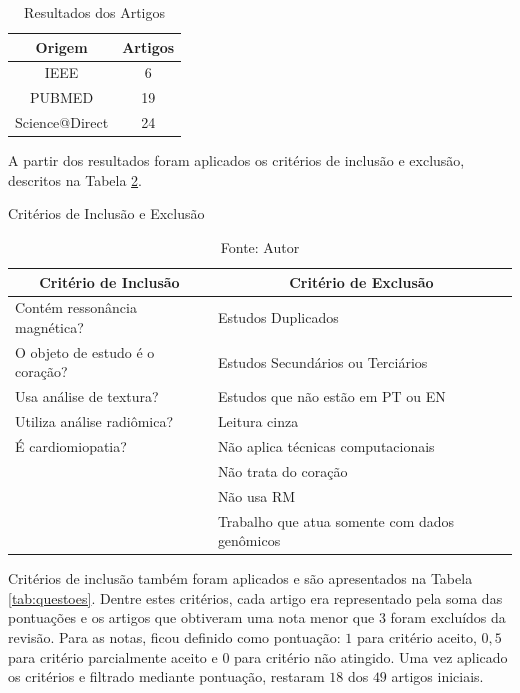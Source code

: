 \begin{table}[hbtp]
    \centering
    \renewcommand{\arraystretch}{1.4} %
    \begin{tabular}{|c|c|}
    \hline 
          \textbf{Origem} & \textbf{Artigos}  \\ 
    \hline 
        IEEE & 6 \\ 
        PUBMED & 19 \\ 
        Science@Direct & 24 \\ 
    \hline 
    \end{tabular} 
    \caption{Resultados dos Artigos}
    \label{tab:resultado_busca}
\end{table}

A partir dos resultados foram aplicados os critérios de inclusão e exclusão, descritos na Tabela \ref{tab:criterios}.

\begin{table}[hbtp]
    \centering
    \caption{Critérios de Inclusão e Exclusão}
    \renewcommand{\arraystretch}{1.4} %
    \begin{tabular}{|l|l|}
    \hline 
          \multicolumn{1}{|c|}{\textbf{Critério de Inclusão}} & \multicolumn{1}{c|}{\textbf{Critério de Exclusão}}  \\ 
    \hline 
        \quad Contém ressonância magnética? & \quad Estudos Duplicados   \\ 
        \quad O objeto de estudo é o coração? & \quad Estudos Secundários ou Terciários \\
        \quad Usa análise de textura? & \quad Estudos que não estão em PT ou EN\\
        \quad Utiliza análise radiômica? & \quad Leitura cinza  \\
        \quad É cardiomiopatia? & \quad Não aplica técnicas computacionais\\
        & \quad Não trata do coração \\
        & \quad Não usa RM \\
        & \quad Trabalho que atua somente com dados genômicos \\ 
    \hline 
    \end{tabular} 
    \caption*{Fonte: Autor}
    \label{tab:criterios}
\end{table}

Critérios de inclusão também foram aplicados e são apresentados na Tabela \ref{tab:questoes}. Dentre estes critérios, cada artigo era representado pela soma das pontuações e os artigos que obtiveram uma nota menor que 3 foram excluídos da revisão. Para as notas, ficou definido como pontuação: $1$ para critério aceito, $0,5$ para critério parcialmente aceito e $0$ para critério não atingido. Uma vez aplicado os critérios e filtrado mediante pontuação, restaram $18$ dos $49$ artigos iniciais.


